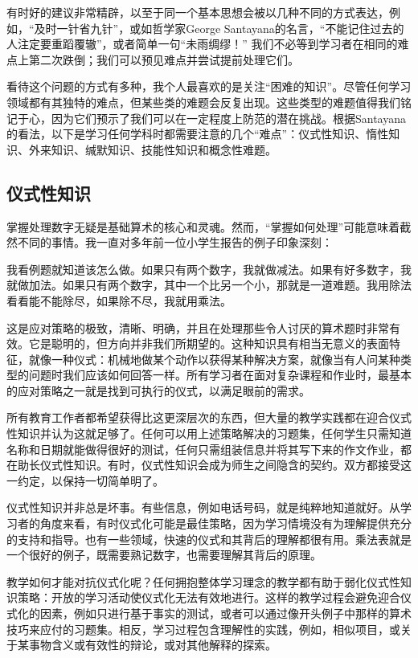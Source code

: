 有时好的建议非常精辟，以至于同一个基本思想会被以几种不同的方式表达，例如，“及时一针省九针”，或如哲学家George Santayana的名言，“不能记住过去的人注定要重蹈覆辙”，或者简单一句“未雨绸缪！” 我们不必等到学习者在相同的难点上第二次跌倒；我们可以预见难点并尝试提前处理它们。

看待这个问题的方式有多种，我个人最喜欢的是关注“困难的知识”。尽管任何学习领域都有其独特的难点，但某些类的难题会反复出现。这些类型的难题值得我们铭记于心，因为它们预示了我们可以在一定程度上防范的潜在挑战。根据Santayana的看法，以下是学习任何学科时都需要注意的几个“难点”：仪式性知识、惰性知识、外来知识、缄默知识、技能性知识和概念性难题。

\subsection*{仪式性知识}

掌握处理数字无疑是基础算术的核心和灵魂。然而，“掌握如何处理”可能意味着截然不同的事情。我一直对多年前一位小学生报告的例子印象深刻：

我看例题就知道该怎么做。如果只有两个数字，我就做减法。如果有好多数字，我就做加法。如果只有两个数字，其中一个比另一个小，那就是一道难题。我用除法看看能不能除尽，如果除不尽，我就用乘法。

这是应对策略的极致，清晰、明确，并且在处理那些令人讨厌的算术题时非常有效。它是聪明的，但方向并非我们所期望的。这种知识具有相当无意义的表面特征，就像一种仪式：机械地做某个动作以获得某种解决方案，就像当有人问某种类型的问题时我们应该如何回答一样。所有学习者在面对复杂课程和作业时，最基本的应对策略之一就是找到可执行的仪式，以满足眼前的需求。

所有教育工作者都希望获得比这更深层次的东西，但大量的教学实践都在迎合仪式性知识并认为这就足够了。任何可以用上述策略解决的习题集，任何学生只需知道名称和日期就能做得很好的测试，任何只需组装信息并将其写下来的作文作业，都在助长仪式性知识。有时，仪式性知识会成为师生之间隐含的契约。双方都接受这一约定，以保持一切简单明了。

仪式性知识并非总是坏事。有些信息，例如电话号码，就是纯粹地知道就好。从学习者的角度来看，有时仪式化可能是最佳策略，因为学习情境没有为理解提供充分的支持和指导。也有一些领域，快速的仪式和其背后的理解都很有用。乘法表就是一个很好的例子，既需要熟记数字，也需要理解其背后的原理。

教学如何才能对抗仪式化呢？任何拥抱整体学习理念的教学都有助于弱化仪式性知识策略：开放的学习活动使仪式化无法有效地进行。这样的教学过程会避免迎合仪式化的因素，例如只进行基于事实的测试，或者可以通过像开头例子中那样的算术技巧来应付的习题集。相反，学习过程包含理解性的实践，例如，相似项目，或关于某事物含义或有效性的辩论，或对其他解释的探索。

